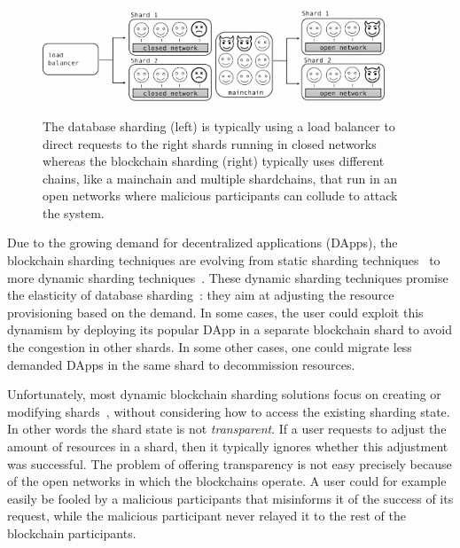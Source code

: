 \documentclass[11pt,dvipdfm]{article}
\begin{document}
\begin{figure}[ht]
\includegraphics[width=0.45\textwidth]{fig/db-sharding.pdf}\hspace{3em}
\includegraphics[width=0.45\textwidth]{fig/bc-sharding.pdf}
\caption{The database sharding (left) is typically using a load balancer to direct requests to the right shards running in closed networks whereas the blockchain sharding (right) typically uses different chains, like a mainchain and multiple shardchains, that run in an open networks where malicious participants can collude to attack the system.\label{fig:differences}
}
\end{figure}

Due to the growing demand for decentralized applications (DApps),
the blockchain sharding techniques are evolving from static sharding techniques~\cite{ZilliqaPaper} to more dynamic sharding techniques~\cite{TG22}.
These dynamic sharding techniques promise the elasticity of database sharding~\cite{10.1145/3477132.3483552,SMA14,TMS14,AMH16}: they aim at adjusting the resource provisioning based on the 
demand. In some cases, the user could exploit this dynamism by deploying its popular DApp in a separate blockchain shard to avoid the congestion in other shards. In some other cases, one could migrate less demanded DApps in the same shard to decommission resources.

Unfortunately, most dynamic blockchain sharding solutions focus on creating or modifying shards~\cite{KB}, without considering how to access 
the existing sharding state. In other words the shard state is not \emph{transparent}. 
If a user requests to adjust the amount of resources in a shard, then it typically ignores whether this adjustment was successful.
The problem of offering transparency is not easy precisely because of the open networks in which the blockchains operate.
A user could for example easily be fooled by a malicious participants that misinforms it of the success of its request, while the malicious participant never relayed it to the rest of the blockchain participants.
\end{document}
